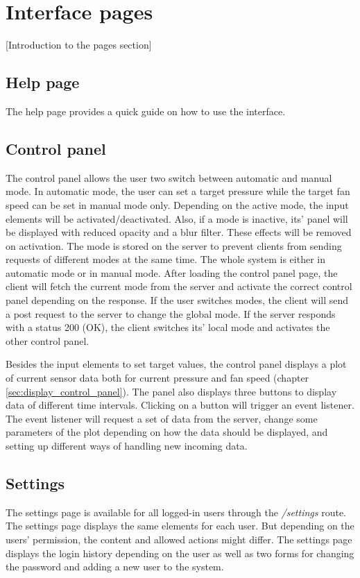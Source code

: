 \chapter{Interface pages}
\label{ch:interface_pages}
[Introduction to the pages section]


\section{Help page}
\label{sec:help}
The help page provides a quick guide on how to use the interface.



\section{Control panel}
\label{sec:control_panel}
The control panel allows the user two switch between automatic and manual mode. In automatic mode, the user can set a target pressure while the target fan speed can be set in manual mode only. Depending on the active mode, the input elements will be activated/deactivated.  Also, if a mode is inactive, its' panel will be displayed with reduced opacity and a blur filter. These effects will be removed on activation. The mode is stored on the server to prevent clients from sending requests of different modes at the same time. The whole system is either in automatic mode or in manual mode. After loading the control panel page, the client will fetch the current mode from the server and activate the correct control panel depending on the response. If the user switches modes, the client will send a post request to the server to change the global mode. If the server responds with a status 200 (OK), the client switches its' local mode and activates the other control panel.

Besides the input elements to set target values, the control panel displays a plot of current sensor data both for current pressure and fan speed (chapter \ref{sec:display_control_panel}). The panel also displays three buttons to display data of different time intervals. Clicking on a button will trigger an event listener. The event listener will request a set of data from the server, change some parameters of the plot depending on how the data should be displayed, and setting up different ways of handling new incoming data.



\section{Settings}
\label{sec:settings}
The settings page is available for all logged-in users through the \textit{/settings} route. The settings page displays the same elements for each user. But depending on the users' permission, the content and allowed actions might differ. The settings page displays the login history depending on the user as well as two forms for changing the password and adding a new user to the system.


